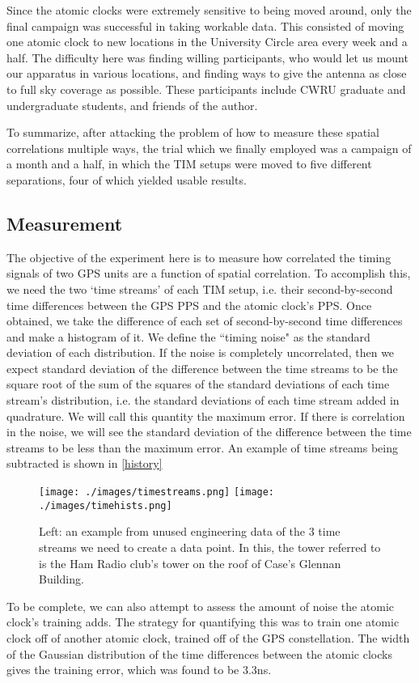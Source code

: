 Since the atomic clocks were extremely sensitive to being moved around, only the final campaign was successful in taking workable data. This consisted of moving one atomic clock to new locations in the University Circle area every week and a half. The difficulty here was finding willing participants, who would let us mount our apparatus in various locations, and finding ways to give the antenna as close to full sky coverage as possible. These participants include CWRU graduate and undergraduate students, and friends of the author. 

To summarize, after attacking the problem of how to measure these spatial correlations multiple ways, the trial which we finally employed was a campaign of a month and a half, in which the TIM setups were moved to five different separations, four of which yielded usable results.
\subsection{Measurement}
The objective of the experiment here is to measure how correlated the timing signals of two GPS units are a function of spatial correlation. To accomplish this, we need the two `time streams' of each TIM setup, i.e. their second-by-second time differences between the GPS PPS and the atomic clock's PPS. Once obtained, we take the difference of each set of second-by-second time differences and make a histogram of it. We define the ``timing noise" as the standard deviation of each distribution. If the noise is completely uncorrelated, then we expect standard deviation of the difference between the time streams to be the square root of the sum of the squares of the standard deviations of each time stream's distribution, i.e. the standard deviations of each time stream added in quadrature. We will call this quantity the maximum error. If there is correlation in the noise, we will see the standard deviation of the difference between the time streams to be less than the maximum error. An example of time streams being subtracted is shown in \autoref{history}
\begin{figure}[h!]
\centering
\texttt{[image: ./images/timestreams.png]}
\texttt{[image: ./images/timehists.png]}
\caption[Time Streams Example]{Left: an example from unused engineering data of the 3 time streams we need to create a data point. In this, the tower referred to is the Ham Radio club's tower on the roof of Case's Glennan Building.}
\label{timemeas}
\end{figure}
To be complete, we can also attempt to assess the amount of noise the atomic clock's training adds. The strategy for quantifying this was to train one atomic clock off of another atomic clock, trained off of the GPS constellation. The width of the Gaussian distribution of the time differences between the atomic clocks gives the training error, which was found to be 3.3ns. 

